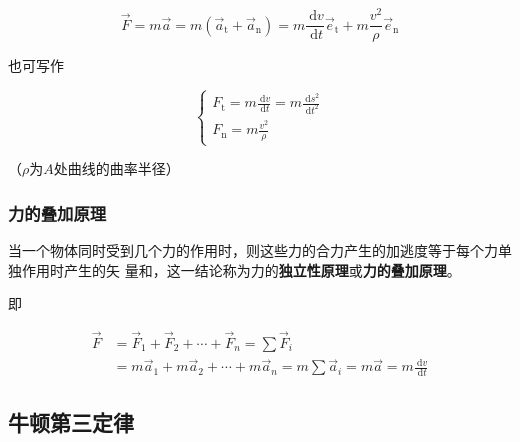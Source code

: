 \documentclass[
	12pt, %
	a4paper, %
]{myLegrandOrangeBook}
\begin{document}
    \begin{equation}
        \overrightarrow{F}=m \overrightarrow{a}=
        m\left(\overrightarrow{a}_{\mathrm{t}}+\overrightarrow{a}_{\mathrm{n}}\right)=
        m \frac{\mathrm{~d} v}{\mathrm{~d} t} \overrightarrow{e}_{\mathrm{t}}+m \frac{v^2}{\rho} \overrightarrow{e}_{\mathrm{n}}
    \end{equation}

    也可写作

    \begin{equation}
        \left\{\begin{array}{l}
        F_{\mathrm{t}}=m \frac{\mathrm{~d} v}{\mathrm{~d} t}=m \frac{\mathrm{~d} s^2}{\mathrm{~d} t^2} \\
        F_{\mathrm{n}}=m \frac{v^2}{\rho}
        \end{array}\right.
    \end{equation}

    （\(\rho\)为\(A\)处曲线的曲率半径）

\subsubsection*{力的叠加原理}

    \begin{theorem}[力的叠加原理]

        当一个物体同时受到几个力的作用时，则这些力的合力产生的加逃度等于每个力单独作用时产生的矢
        量和，这一结论称为力的\textbf{独立性原理}或\textbf{力的叠加原理}。

        即

        \begin{equation}
            \begin{aligned}
            \overrightarrow{F} & =\overrightarrow{F}_1+\overrightarrow{F}_2+\cdots+\overrightarrow{F}_n=\sum \overrightarrow{F}_i \\
            & =m \overrightarrow{a}_1+m \overrightarrow{a}_2+\cdots+m \overrightarrow{a}_n=m \sum \overrightarrow{a}_i=m \overrightarrow{a}=m \frac{\mathrm{~d} v}{\mathrm{~d} t}
            \end{aligned}
        \end{equation}

\end{theorem}

\subsection{牛顿第三定律}
\end{document}
